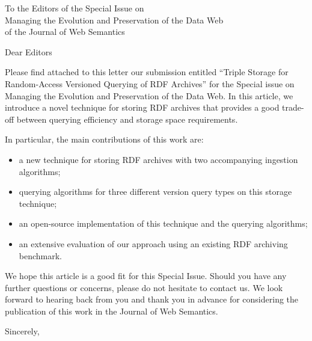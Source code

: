 \documentclass{letter}
\begin{document}
\begin{letter}{To the Editors of the Special Issue on\\Managing the Evolution and Preservation of the Data Web\\of the Journal of Web Semantics}
\opening{Dear Editors}

\null\vspace{\baselineskip}

{\parfillskip 0pt
Please find attached to this letter our submission entitled
\enquote{Triple Storage for Random-Access Versioned Querying of RDF Archives}
for the Special issue on Managing the Evolution and Preservation of the Data Web.
In this article,
we introduce a novel technique for storing RDF archives
that provides a good trade-off between querying efficiency and storage space requirements.
}

In particular, the main contributions of this work are:
\begin{itemize}
  \item a new technique for storing RDF archives with two accompanying ingestion algorithms;
  \item querying algorithms for three different version query types on this storage technique;
  \item an open-source implementation of this technique and the querying algorithms;
  \item an extensive evaluation of our approach using an existing RDF archiving benchmark.
\end{itemize}

{\parfillskip 0pt
We hope this article is a good fit for this Special Issue.
Should you have any further questions or concerns, please do not hesitate to contact us.
We look forward to hearing back from you and thank you in advance
for considering the publication of this work in the Journal of Web Semantics.
}

\null\vspace{\baselineskip}

\closing{Sincerely,}

\end{letter}
\end{document}
